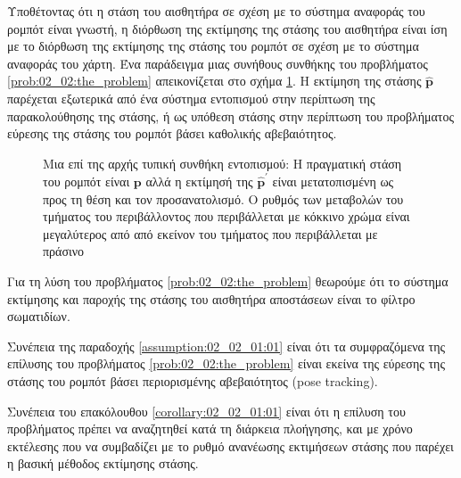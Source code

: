 Υποθέτοντας ότι η στάση του αισθητήρα σε σχέση με το σύστημα αναφοράς του
ρομπότ είναι γνωστή, η διόρθωση της εκτίμησης της στάσης του αισθητήρα είναι
ίση με το διόρθωση της εκτίμησης της στάσης του ρομπότ σε σχέση με το σύστημα
αναφοράς του χάρτη. Ένα παράδειγμα μιας συνήθους συνθήκης του προβλήματος
\ref{prob:02_02:the_problem} απεικονίζεται στο σχήμα
\ref{fig:02_02:the_problem}. Η εκτίμηση της στάσης $\hat{\bm{p}}$
παρέχεται εξωτερικά από ένα σύστημα εντοπισμού στην περίπτωση της
παρακολούθησης της στάσης, ή ως υπόθεση στάσης στην περίπτωση του προβλήματος
εύρεσης της στάσης του ρομπότ βάσει καθολικής αβεβαιότητος.

\begin{figure}[]\centering
  
  \caption{\small Μια επί της αρχής τυπική συνθήκη εντοπισμού: Η πραγματική
           στάση του ρομπότ είναι $\bm{p}$ αλλά η εκτίμησή της
           $\hat{\bm{p}}^\prime$ είναι μετατοπισμένη ως προς τη θέση και τον
           προσανατολισμό. Ο ρυθμός των μεταβολών του τμήματος του
           περιβάλλοντος που περιβάλλεται με κόκκινο χρώμα είναι μεγαλύτερος
           από από εκείνον του τμήματος που περιβάλλεται με πράσινο}
  \label{fig:02_02:the_problem}
\end{figure}


\begin{bw_box}
  \begin{assumption}
    \label{assumption:02_02_01:01}
    Για τη λύση του προβλήματος \ref{prob:02_02:the_problem} θεωρούμε ότι το
    σύστημα εκτίμησης και παροχής της στάσης του αισθητήρα αποστάσεων είναι το
    φίλτρο σωματιδίων.
  \end{assumption}
\end{bw_box}

\begin{bw_box}
  \begin{corollary}
    \label{corollary:02_02_01:01}
    Συνέπεια της παραδοχής \ref{assumption:02_02_01:01} είναι ότι τα
    συμφραζόμενα της επίλυσης του προβλήματος \ref{prob:02_02:the_problem}
    είναι εκείνα της εύρεσης της στάσης του ρομπότ βάσει περιορισμένης
    αβεβαιότητος (pose tracking).
  \end{corollary}
\end{bw_box}

\begin{bw_box}
  \begin{corollary}
    \label{corollary:02_02_01:02}
    Συνέπεια του επακόλουθου \ref{corollary:02_02_01:01} είναι ότι η επίλυση
    του προβλήματος πρέπει να αναζητηθεί κατά τη διάρκεια πλοήγησης, και με
    χρόνο εκτέλεσης που να συμβαδίζει με το ρυθμό ανανέωσης εκτιμήσεων στάσης
    που παρέχει η βασική μέθοδος εκτίμησης στάσης.
  \end{corollary}
\end{bw_box}

